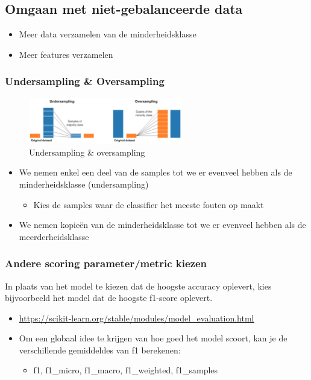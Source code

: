 \documentclass{article}
\begin{document}
\subsection{Omgaan met niet-gebalanceerde data}

\begin{itemize}
    \item Meer data verzamelen van de minderheidsklasse
    \item Meer features verzamelen
\end{itemize}

\subsubsection{Undersampling \& Oversampling}

\begin{figure}[H]
    \centering
    \includegraphics[width=0.6\textwidth]{niet-gebalanceerde-data-sampling.png}
    \caption{Undersampling \& oversampling}
\end{figure}

\begin{itemize}
    \item We nemen enkel een deel van de samples tot we er evenveel hebben als de minderheidsklasse (undersampling)
    \begin{itemize}
        \item Kies de samples waar de classifier het meeste fouten op maakt
    \end{itemize}
    \item We nemen kopieën van de minderheidsklasse tot we er evenveel hebben als de meerderheidsklasse
\end{itemize}

\subsubsection{Andere scoring parameter/metric kiezen}

In plaats van het model te kiezen dat de hoogste accuracy oplevert, kies bijvoorbeeld het model dat de hoogste f1-score oplevert.

\begin{itemize}
    \item \url{https://scikit-learn.org/stable/modules/model_evaluation.html}
    \item Om een globaal idee te krijgen van hoe goed het model scoort, kan je de verschillende gemiddeldes van f1 berekenen:
    \begin{itemize}
        \item f1, f1\_micro, f1\_macro, f1\_weighted, f1\_samples
    \end{itemize}
\end{itemize}
\end{document}
